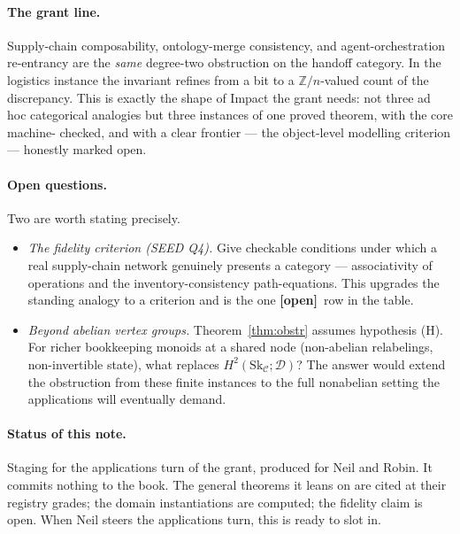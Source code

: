 \documentclass[11pt]{article}
\theoremstyle{definition}
\newcommand{\C}{\mathcal{C}}
\newcommand{\D}{\mathcal{D}}
\newcommand{\Sk}{\mathrm{Sk}}
\newcommand{\Zn}{\mathbb{Z}/n}
\newcommand{\gOpen}{\textbf{[open]}}
\begin{document}
\paragraph{The grant line.} Supply-chain composability, ontology-merge consistency, and
agent-orchestration re-entrancy are the \emph{same} degree-two obstruction on the handoff
category. In the logistics instance the invariant refines from a bit to a $\Zn$-valued count
of the discrepancy. This is exactly the shape of Impact the grant needs: not three ad hoc
categorical analogies but three instances of one proved theorem, with the core machine-
checked, and with a clear frontier --- the object-level modelling criterion --- honestly
marked open.

\paragraph{Open questions.} Two are worth stating precisely.
\begin{itemize}
\item \emph{The fidelity criterion (SEED Q4).} Give checkable conditions under which a real
supply-chain network genuinely presents a category --- associativity of operations and the
inventory-consistency path-equations. This upgrades the standing analogy to a criterion and
is the one \gOpen\ row in the table.
\item \emph{Beyond abelian vertex groups.} Theorem~\ref{thm:obstr} assumes hypothesis (H).
For richer bookkeeping monoids at a shared node (non-abelian relabelings, non-invertible
state), what replaces $H^2(\Sk_\C;\D)$? The answer would extend the obstruction from these
finite instances to the full nonabelian setting the applications will eventually demand.
\end{itemize}

\paragraph{Status of this note.} Staging for the applications turn of the grant, produced for
Neil and Robin. It commits nothing to the book. The general theorems it leans on are cited at
their registry grades; the domain instantiations are computed; the fidelity claim is open.
When Neil steers the applications turn, this is ready to slot in.
\end{document}

